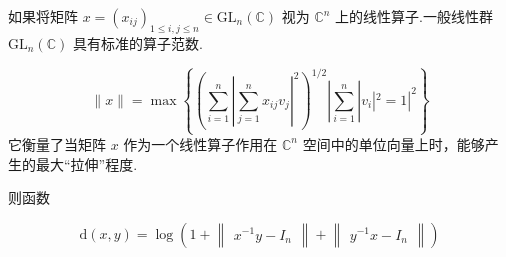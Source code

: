 \documentclass[lang=cn,a4paper,11pt,openany,scheme=chinese]{elegantbook}
\renewcommand{\leq}{\leqslant}
\begin{document}
\setcounter{instance}{2}
\begin{instance}
如果将矩阵 \(x = {\left( {x}_{ij}\right) }_{1 \leq  i,j \leq  n} \in  {\mathrm{{GL}}}_{n}\left( \mathbb{C}\right)\) 视为 \({\mathbb{C}}^{n}\) 上的线性算子.一般线性群 \({\mathrm{{GL}}}_{n}\left( \mathbb{C}\right)\) 具有标准的算子范数.

\[
\|x\|  = \max \left\{  {{\left( \mathop{\sum }\limits_{{i = 1}}^{n}{\left| \mathop{\sum }\limits_{{j = 1}}^{n}{x}_{ij}{v}_{j}\right| }^{2}\right) }^{1/2}\left| \mathop{\sum }\limits_{{i = 1}}^{n}\right| {v}_{i}{\left| {}^{2} = 1\right| }^{2}}\right\}
\]
它衡量了当矩阵 $x$ 作为一个线性算子作用在 $\mathbb{C}^n$ 空间中的单位向量上时，能够产生的最大“拉伸”程度.

则函数

\[
\mathrm{d}\left( {x,y}\right)  = \log \left( {1 + \begin{Vmatrix}{{x}^{-1}y - {I}_{n}}\end{Vmatrix} + \begin{Vmatrix}{{y}^{-1}x - {I}_{n}}\end{Vmatrix}}\right)
\]


\end{instance}
\end{document}
